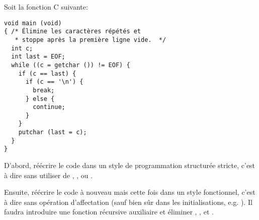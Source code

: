 \begin{Exercise}[title={Programmation fonctionnelle en C}]
  \label{ex:pfonc_c}
Soit la fonction C suivante:
\begin{verbatim}
void main (void)
{ /* Élimine les caractères répétés et
   * stoppe après la première ligne vide.  */
  int c;
  int last = EOF;
  while ((c = getchar ()) != EOF) {
    if (c == last) {
      if (c == '\n') {
        break;
      } else {
        continue;
      }
    }
    putchar (last = c);
  }
}
\end{verbatim}
D'abord, réécrire le code dans un style de programmation structurée
stricte, c'est à dire sans utiliser de ,
, ou .

Ensuite, réécrire le code à nouveau mais cette fois dans un style
fonctionnel, c'est à dire sans opération d'affectation (sauf bien sûr dans
les initialisations, e.g. ).  Il faudra
introduire une fonction récursive auxiliaire et éliminer ,
, et .
\end{Exercise}
\begin{Answer}[ref={ex:pfonc_c}]
\end{Answer}